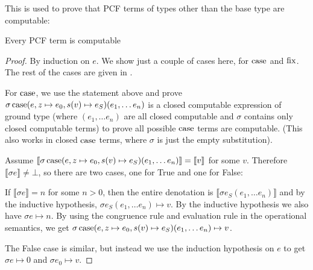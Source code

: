 
This is used to prove that PCF terms of types other than the base type are computable:

\vspace{0.5cm}

\begin{thm}
Every PCF term is computable
\end{thm}

\begin{proof}
By induction on $e$. We show just a couple of cases here, for $\operatorname{case}$ and $\operatorname{fix}$. The rest of the cases are given in \citep{Gunter92}.

For $\operatorname{case}$, we use the statement above and prove $\sigma \operatorname{case}(e, z \mapsto e_0, s(v) \mapsto e_S)(e_1, \dots e_n)$ is a closed computable expression of ground type (where $(e_1, \dots e_n)$ are all closed  computable and $\sigma$ contains only closed computable terms) to prove all possible $\operatorname{case}$ terms are computable. (This also works in closed $\operatorname{case}$ terms, where $\sigma$ is just the empty substitution).  

Assume $\llbracket  \sigma \operatorname{case}(e, z \mapsto e_0, s(v) \mapsto e_S)(e_1, \dots e_n) \rrbracket = \llbracket v \rrbracket$ for some $v$. Therefore $\llbracket \sigma e \rrbracket \neq \bot$, so there are two cases, one for True and one for False:

If $\llbracket \sigma e \rrbracket = n$ for some $n > 0$, then the entire denotation is $\llbracket \sigma e_S (e_1, \dots e_n) \rrbracket$ and by the inductive hypothesis,  $\sigma e_S (e_1, \dots e_n)  \mapsto v$. By the inductive hypothesis we also have $\sigma e \mapsto n$. By using the congruence rule and evaluation rule in the operational semantics, we get $\sigma \operatorname{case}(e, z \mapsto e_0, s(v) \mapsto e_S)(e_1, \dots e_n) \mapsto v$.

The False case is similar, but instead we use the induction hypothesis on $e$ to get $\sigma e \mapsto 0$ and $\sigma e_0 \mapsto v$.



\end{proof}
